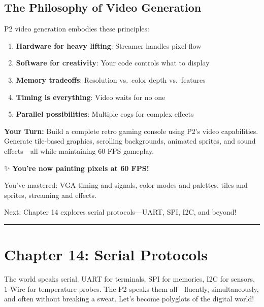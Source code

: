 \documentclass[11pt]{book}
\providecommand{\tightlist}{%
  \setlength{\itemsep}{0pt}\setlength{\parskip}{0pt}}
\begin{document}
\hypertarget{the-philosophy-of-video-generation}{%
\subsection{The Philosophy of Video
Generation}\label{the-philosophy-of-video-generation}}

P2 video generation embodies these principles:

\begin{enumerate}
\def\labelenumi{\arabic{enumi}.}
\tightlist
\item
  \textbf{Hardware for heavy lifting}: Streamer handles pixel flow
\item
  \textbf{Software for creativity}: Your code controls what to display
\item
  \textbf{Memory tradeoffs}: Resolution vs.~color depth vs.~features
\item
  \textbf{Timing is everything}: Video waits for no one
\item
  \textbf{Parallel possibilities}: Multiple cogs for complex effects
\end{enumerate}

\textbf{Your Turn:} Build a complete retro gaming console using P2's
video capabilities. Generate tile-based graphics, scrolling backgrounds,
animated sprites, and sound effects---all while maintaining 60 FPS
gameplay.

\begin{chapterend}
✨ \textbf{You're now painting pixels at 60 FPS!}

You've mastered: VGA timing and signals, color modes and palettes, tiles and sprites, streaming and effects.

Next: Chapter 14 explores serial protocols—UART, SPI, I2C, and beyond!
\end{chapterend}

\begin{center}\rule{0.5\linewidth}{0.5pt}\end{center}

\hypertarget{chapter-14-serial-protocols}{%
\section{Chapter 14: Serial
Protocols}\label{chapter-14-serial-protocols}}

The world speaks serial. UART for terminals, SPI for memories, I2C for
sensors, 1-Wire for temperature probes. The P2 speaks them
all---fluently, simultaneously, and often without breaking a sweat.
Let's become polyglots of the digital world!
\end{document}
